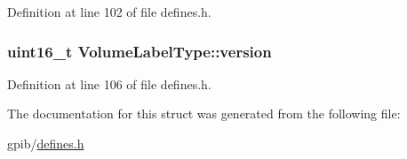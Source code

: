Definition at line 102 of file defines.\+h.

\subsubsection[{\texorpdfstring{version}{version}}]{\setlength{\rightskip}{0pt plus 5cm}uint16\+\_\+t Volume\+Label\+Type\+::version}\hypertarget{structVolumeLabelType_a59f56fd1f28549bc625aeaaa57c8d0d2}{}\label{structVolumeLabelType_a59f56fd1f28549bc625aeaaa57c8d0d2}


Definition at line 106 of file defines.\+h.



The documentation for this struct was generated from the following file\+:\begin{DoxyCompactItemize}
\item 
gpib/\hyperlink{defines_8h}{defines.\+h}\end{DoxyCompactItemize}
